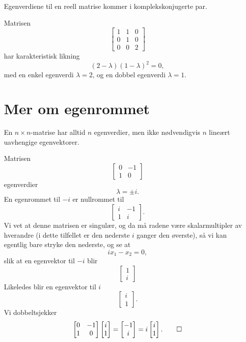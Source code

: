 \begin{thm}
Egenverdiene til en reell matrise kommer i komplekskonjugerte par.
\end{thm}


\begin{ex}
Matrisen
\[
\begin{bmatrix}
1 & 1 & 0\\  0 &1 & 0 \\ 0 & 0 & 2
\end{bmatrix}
\]
har karakteristisk likning
\[
(2-\lambda)(1-\lambda)^2=0,
\]
med en enkel egenverdi $\lambda=2$, og en dobbel egenverdi $\lambda=1$. 
\end{ex}


\section*{Mer om egenrommet}
En $n \times n$-matrise har alltid $n$ egenverdier, 
men ikke nødvendigvis $n$ lineært uavhengige egenvektorer.

\begin{ex}
Matrisen
\[
\begin{bmatrix}
0 & -1 \\ 1 &0
\end{bmatrix}
\]
egenverdier
\[
\lambda=\pm i.
\] 
En egenrommet til $-i$ er nullrommet til 
\[
\begin{bmatrix}
i & -1 \\ 1 &i
\end{bmatrix}.
\]
Vi vet at denne matrisen er singulær, 
og da må radene være skalarmultipler av hverandre (i dette tilfellet er den nederste $i$ ganger den øverste), 
så vi kan egentlig bare stryke den nederste, og se at
\[
ix_1-x_2=0,
\]
slik at en egenvektor til $-i$ blir
\[
\begin{bmatrix}
1  \\ i
\end{bmatrix}
\]
Likeledes blir en egenvektor til $i$ 
\[
\begin{bmatrix}
i  \\ 1
\end{bmatrix}.
\]
Vi dobbeltsjekker
\[
\begin{bmatrix}
0 & -1 \\ 1 &0
\end{bmatrix}
\begin{bmatrix}
i  \\ 1
\end{bmatrix}
=
\begin{bmatrix}
-1  \\ i
\end{bmatrix}
=
i
\begin{bmatrix}
i  \\ 1
\end{bmatrix}.\qedhere
\]
\end{ex}

